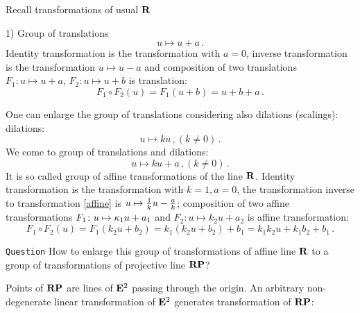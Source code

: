 \documentclass[12pt]{article}
\numberwithin{equation}{section}
\begin{document}
Recall transformations of usual ${\bf R}$


1)    Group of translations  
                \begin{equation}\label{translation}
               u\mapsto u+a\,.
                \end{equation}
{\footnotesize Identity transformation is the 
transformation with $a=0$, inverse
transformation is the transformation $u\mapsto u-a$ and
composition of two translations $F_1\colon u\mapsto u+a$,
$F_2\colon u\mapsto u+b$ is translation:
                       $$
   F_1\circ F_2(u)=F_1(u+b)=u+b+a\,.
                       $$
}

  One can enlarge the group of translations considering also 
dilations (scalings):
    dilations: 
              \begin{equation*}
               u\mapsto ku\,, (k\not =0)\,.
                \end{equation*}
We come to group of translations and dilations:
                \begin{equation}\label{affine}
               u\mapsto ku+a\,, (k\not =0)\,.
                \end{equation}
It is so called group of affine transformations of the line ${\bf R}$.
 {\footnotesize Identity transformation is the transformation
with $k=1,a=0$, the transformation inverse to transformation
\eqref{affine} is $u\mapsto {1\over k}u-{a\over k}$;   
composition of two affine transformations  
$F_1\colon u\mapsto{\bf \kappa}_1u+a_1$ and
$F_2\colon u\mapsto k_2u+a_2$ is affine transformation:
                       $$
   F_1\circ F_2(u)=F_1(k_2u+b_2)=k_1(k_2u+b_2)+b_1=k_1k_2u+k_1b_2+b_1\,.
                       $$
}
              



{\tt Question}  How to enlarge this group of transformations of
affine line ${\bf R}$ to a group of transformations
of projective line ${\bf R}{\bf P}$?




 Points of ${\bf R}{\bf P}$ are lines of ${\bf E}^2$ passing through the origin.
   An arbitrary non-degenerate linear transformation of ${\bf E}^2$
generates transformation of ${\bf R}{\bf P}$:
   
                  
\end{document}
